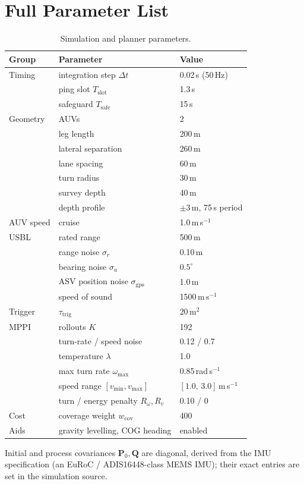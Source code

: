 \documentclass[12pt,a4paper,oneside]{book}
\begin{document}
\appendix
\chapter{Full Parameter List}
\label{app:params}
\begin{table}[H]
\centering
\caption{Simulation and planner parameters.}
\begin{tabular}{@{}lll@{}}
\toprule
Group & Parameter & Value \\
\midrule
Timing        & integration step $\Delta t$ & 0.02\,s (50\,Hz) \\
              & ping slot $T_{\text{slot}}$ & 1.3\,s \\
              & safeguard $T_{\text{safe}}$ & 15\,s \\
Geometry      & AUVs & 2 \\
              & leg length & 200\,m \\
              & lateral separation & 260\,m \\
              & lane spacing & 60\,m \\
              & turn radius & 30\,m \\
              & survey depth & 40\,m \\
              & depth profile & $\pm$3\,m, 75\,s period \\
AUV speed     & cruise & 1.0\,m$\,$s$^{-1}$ \\
USBL          & rated range & 500\,m \\
              & range noise $\sigma_r$ & 0.10\,m \\
              & bearing noise $\sigma_a$ & $0.5^{\circ}$ \\
              & ASV position noise $\sigma_{\text{gps}}$ & 1.0\,m \\
              & speed of sound & 1500\,m$\,$s$^{-1}$ \\
Trigger       & $\tau_{\text{trig}}$ & 20\,m$^2$ \\
MPPI          & rollouts $K$ & 192 \\
              & turn-rate / speed noise & 0.12 / 0.7 \\
              & temperature $\lambda$ & 1.0 \\
              & max turn rate $\omega_{\max}$ & 0.85\,rad$\,$s$^{-1}$ \\
              & speed range $[v_{\min},v_{\max}]$ & $[1.0,\,3.0]$\,m$\,$s$^{-1}$ \\
              & turn / energy penalty $R_\omega,R_v$ & 0.10 / 0 \\
Cost          & coverage weight $w_{\text{cov}}$ & 400 \\
Aids          & gravity levelling, COG heading & enabled \\
\bottomrule
\end{tabular}
\end{table}
\noindent Initial and process covariances $\mathbf{P}_0,\mathbf{Q}$ are diagonal, derived from the IMU
specification (an EuRoC / ADIS16448-class MEMS IMU); their exact entries are set in the simulation source.
\end{document}
